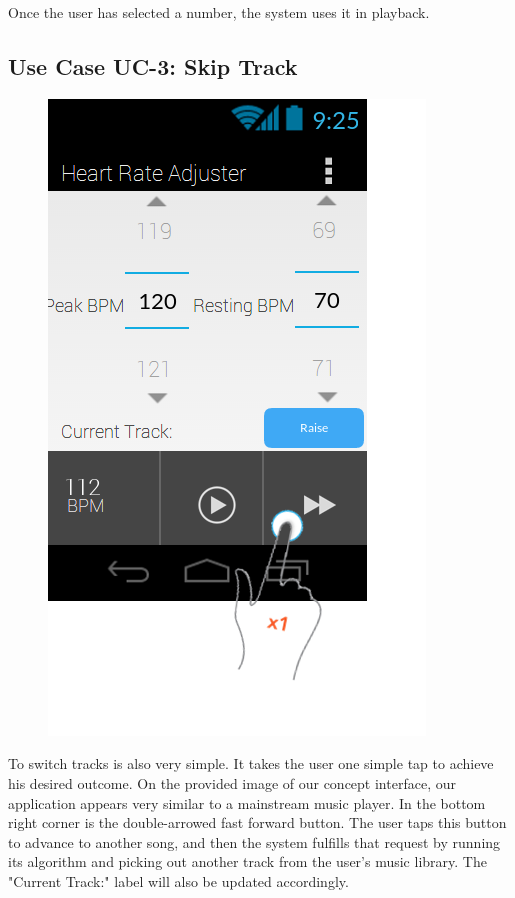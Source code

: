 \documentclass[letterpaper,english, 12pt]{scrreprt}
\begin{document}
Once the user has selected a number, the system uses it in playback.

\subsection{Use Case UC-3: Skip Track}

\begin{figure}[H]
	\centering
	\includegraphics{img/Prelim_Design/PrelimDesign_2.png}\\
\end{figure}

To switch tracks is also very simple. It takes the user one simple tap to achieve his desired outcome. On the provided image of our concept interface, our application appears very similar to a mainstream music player. In the bottom right corner is the double-arrowed fast forward button. The user taps this button to advance to another song, and then the system fulfills that request by running its algorithm and picking out another track from the user's music library. The "Current Track:" label will also be updated accordingly.
\end{document}
